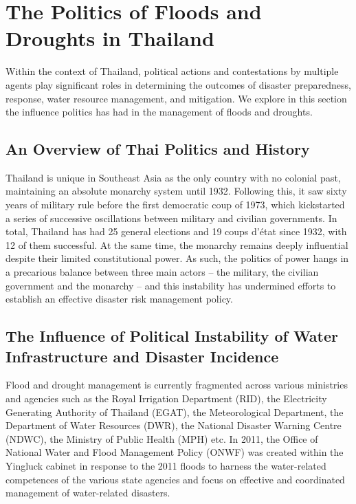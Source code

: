 \section{The Politics of Floods and Droughts in Thailand}

Within the context of Thailand, political actions and contestations by multiple agents play significant roles in determining the outcomes of disaster preparedness, response, water resource management, and mitigation. We explore in this section the influence politics has had in the management of floods and droughts.

\subsection{An Overview of Thai Politics and History}

Thailand is unique in Southeast Asia as the only country with no colonial past, maintaining an absolute monarchy system until 1932. Following this, it saw sixty years of military rule before the first democratic coup of 1973, which kickstarted a series of successive oscillations between military and civilian governments. In total, Thailand has had 25 general elections and 19 coups d'état since 1932, with 12 of them successful. At the same time, the monarchy remains deeply influential despite their limited constitutional power. As such, the politics of power hangs in a precarious balance between three main actors -- the military, the civilian government and the monarchy -- and this instability has undermined efforts to establish an effective disaster risk management policy. 

\subsection{The Influence of Political Instability of Water Infrastructure and Disaster Incidence}

Flood and drought management is currently fragmented across various ministries and agencies such as the Royal Irrigation Department (RID), the Electricity Generating Authority of Thailand (EGAT), the Meteorological Department, the Department of Water Resources (DWR), the National Disaster Warning Centre (NDWC), the Ministry of Public Health (MPH) etc. In 2011, the Office of National Water and Flood Management Policy (ONWF) was created within the Yingluck cabinet in response to the 2011 floods to harness the water-related competences of the various state agencies and focus on effective and coordinated management of water-related disasters. 

